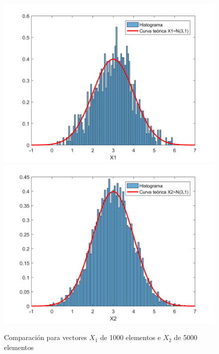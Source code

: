 \begin{figure}[!ht]
\begin{centering}
\includegraphics[scale=0.55]{Imagenes/X1_1000.png}
\includegraphics[scale=0.55]{Imagenes/X2_5000.png}
\par\end{centering}
\caption{Comparación para vectores $X_1$ de 1000 elementos e $X_2$ de 5000 elementos}

\end{figure} 

\newpage

